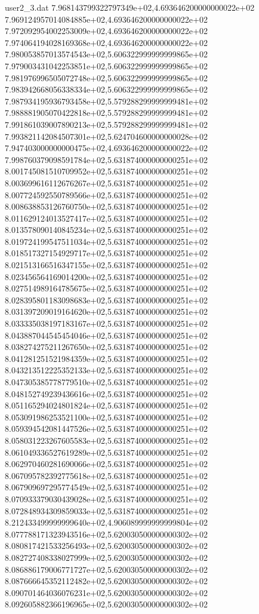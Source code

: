 \begin{filecontents}{user2_3.dat}
7.968143799322797349e+02,4.693646200000000022e+02
7.969124957014084885e+02,4.693646200000000022e+02
7.972092954002253009e+02,4.693646200000000022e+02
7.974064194028169368e+02,4.693646200000000022e+02
7.980053857013574543e+02,5.606322999999999865e+02
7.979003431042253851e+02,5.606322999999999865e+02
7.981976996505072748e+02,5.606322999999999865e+02
7.983942668056338334e+02,5.606322999999999865e+02
7.987934195936793458e+02,5.579288299999999481e+02
7.988881905070422818e+02,5.579288299999999481e+02
7.991861039007890213e+02,5.579288299999999481e+02
7.993821142084507301e+02,5.624704600000000028e+02
7.947403000000000475e+02,4.693646200000000022e+02
7.998760379098591784e+02,5.631874000000000251e+02
8.001745081510709952e+02,5.631874000000000251e+02
8.003699616112676267e+02,5.631874000000000251e+02
8.007724592550789566e+02,5.631874000000000251e+02
8.008638853126760750e+02,5.631874000000000251e+02
8.011629124013527417e+02,5.631874000000000251e+02
8.013578090140845234e+02,5.631874000000000251e+02
8.019724199547511034e+02,5.631874000000000251e+02
8.018517327154929717e+02,5.631874000000000251e+02
8.021513166516347155e+02,5.631874000000000251e+02
8.023456564169014200e+02,5.631874000000000251e+02
8.027514989164785675e+02,5.631874000000000251e+02
8.028395801183098683e+02,5.631874000000000251e+02
8.031397209019164620e+02,5.631874000000000251e+02
8.033335038197183167e+02,5.631874000000000251e+02
8.043887044545454046e+02,5.631874000000000251e+02
8.038274275211267650e+02,5.631874000000000251e+02
8.041281251521984359e+02,5.631874000000000251e+02
8.043213512225352133e+02,5.631874000000000251e+02
8.047305385778779510e+02,5.631874000000000251e+02
8.048152749239436616e+02,5.631874000000000251e+02
8.051165294024801824e+02,5.631874000000000251e+02
8.053091986253521100e+02,5.631874000000000251e+02
8.059394542081447526e+02,5.631874000000000251e+02
8.058031223267605583e+02,5.631874000000000251e+02
8.061049336527619289e+02,5.631874000000000251e+02
8.062970460281690066e+02,5.631874000000000251e+02
8.067095782392775618e+02,5.631874000000000251e+02
8.067909697295774549e+02,5.631874000000000251e+02
8.070933379030439028e+02,5.631874000000000251e+02
8.072848934309859033e+02,5.631874000000000251e+02
8.212433499999999640e+02,4.906089999999999804e+02
8.077788171323943516e+02,5.620030500000000302e+02
8.080817421533256493e+02,5.620030500000000302e+02
8.082727408338027999e+02,5.620030500000000302e+02
8.086886179006771727e+02,5.620030500000000302e+02
8.087666645352112482e+02,5.620030500000000302e+02
8.090701464036076231e+02,5.620030500000000302e+02
8.092605882366196965e+02,5.620030500000000302e+02

\end{filecontents}
